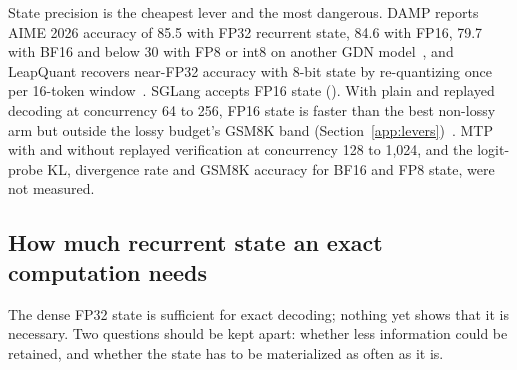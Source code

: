 State precision is the cheapest lever and the most dangerous. DAMP reports AIME 2026 accuracy of 85.5 with FP32 recurrent state, 84.6 with FP16, 79.7 with BF16 and below 30 with FP8 or int8 on another GDN model~\cite{damp}, and LeapQuant recovers near-FP32 accuracy with 8-bit state by re-quantizing once per 16-token window~\cite{leapquant}. SGLang accepts FP16 state (). With plain and replayed decoding at concurrency 64 to 256, FP16 state is faster than the best non-lossy arm but outside the lossy budget's GSM8K band (Section~\ref{app:levers})~. MTP with and without replayed verification at concurrency 128 to 1,024, and the logit-probe KL, divergence rate and GSM8K accuracy for BF16 and FP8 state, were not measured.

\subsection{How much recurrent state an exact computation needs}\label{app:minimal-state}\label{sec:minimal-state}\label{sec:stack-state-need}
The dense FP32 state is sufficient for exact decoding; nothing yet shows that it is necessary. Two questions should be kept apart: whether less information could be retained, and whether the state has to be materialized as often as it is.

